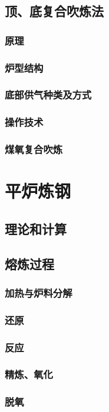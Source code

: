 \documentclass[UTF8]{../../ApplicationUniverse}
\begin{document}
    \subsection{顶、底复合吹炼法}
        \subsubsection{原理}
        \subsubsection{炉型结构}
        \subsubsection{底部供气种类及方式}
        \subsubsection{操作技术}
        \subsubsection{煤氧复合吹炼}
\section{平炉炼钢}
    \subsection{理论和计算}
    \subsection{熔炼过程}
        \subsubsection{加热与炉料分解}
        \subsubsection{还原}
        \subsubsection{反应}
        \subsubsection{精炼、氧化}
        \subsubsection{脱氧}
\end{document}
